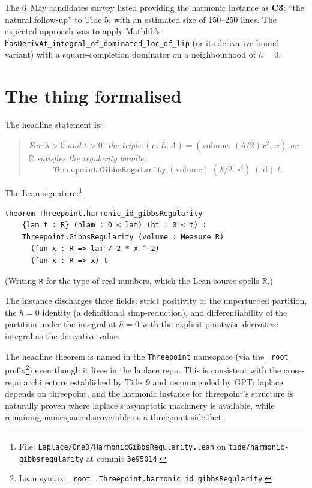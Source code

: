 \documentclass[11pt]{article}
\begin{document}
The 6~May candidates survey listed providing the harmonic instance
as \textbf{C3}: ``the natural follow-up'' to Tide 5, with an estimated
size of 150--250 lines. The expected approach was to apply
Mathlib's \texttt{hasDerivAt\_integral\_of\_dominated\_loc\_of\_lip}
(or its derivative-bound variant) with a square-completion
dominator on a neighbourhood of $h = 0$.

\section{The thing formalised}

The headline statement is:

\begin{quote}\itshape
For $\lambda > 0$ and $t > 0$, the triple
$(\mu, L, A) = (\mathrm{volume},\, (\lambda/2)x^2,\, x)$ on $\mathbb{R}$
satisfies the regularity bundle:
\[
  \mathtt{Threepoint.GibbsRegularity}\;
    (\mathrm{volume})\; (\lambda/2 \cdot \square^2)\; (\mathrm{id})\; t.
\]
\end{quote}

The Lean signature:\footnote{File:
\texttt{Laplace/OneD/HarmonicGibbsRegularity.lean} on
\texttt{tide/harmonic-gibbsregularity} at commit \texttt{3e95014}.}

\begin{verbatim}
theorem Threepoint.harmonic_id_gibbsRegularity
    {lam t : R} (hlam : 0 < lam) (ht : 0 < t) :
    Threepoint.GibbsRegularity (volume : Measure R)
      (fun x : R => lam / 2 * x ^ 2)
      (fun x : R => x) t
\end{verbatim}

(Writing \texttt{R} for the type of real numbers, which the Lean
source spells \texttt{$\mathbb{R}$}.)

The instance discharges three fields: strict positivity of the
unperturbed partition, the $h = 0$ identity (a definitional
simp-reduction), and differentiability of the partition under the
integral at $h = 0$ with the explicit pointwise-derivative integral
as the derivative value.

The headline theorem is named in the \texttt{Threepoint} namespace
(via the \texttt{\_root\_} prefix\footnote{Lean syntax:
\texttt{\_root\_.Threepoint.harmonic\_id\_gibbsRegularity}.}) even
though it lives in the laplace repo. This is consistent with the
cross-repo architecture established by Tide~9 and recommended by GPT:
laplace depends on threepoint, and the harmonic instance for
threepoint's structure is naturally proven where laplace's
asymptotic machinery is available, while remaining
namespace-discoverable as a threepoint-side fact.
\end{document}

